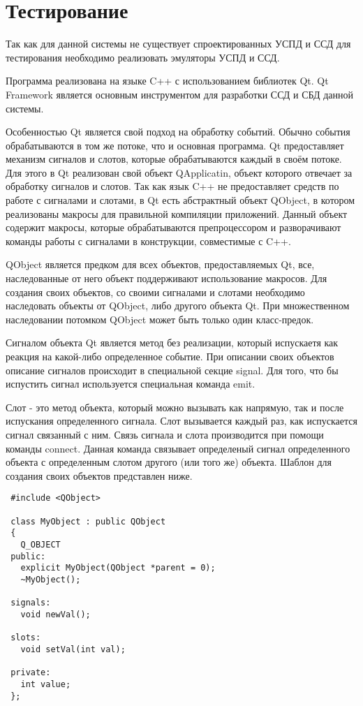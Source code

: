 \newpage
\section{Тестирование}
\setcounter{figure}{0}

Так как для данной системы не существует спроектированных УСПД и ССД для тестирования необходимо реализовать эмуляторы УСПД и ССД. 

Программа реализована на языке C++ с использованием библиотек Qt. Qt Framework является основным инструментом для разработки ССД и СБД данной системы.

Особенностью Qt является свой подход на обработку событий. Обычно события обрабатываются в том же потоке, что и основная программа. Qt предоставляет механизм сигналов и слотов, которые обрабатываются каждый в своём потоке. Для этого в Qt реализован свой объект QApplicatin, объект которого отвечает за обработку сигналов и слотов. Так как язык C++ не предоставляет средств по работе с сигналами и слотами, в Qt есть абстрактный объект QObject, в котором реализованы макросы для правильной компиляции приложений. Данный объект содержит макросы, которые обрабатываются препроцессором и разворачивают команды работы с сигналами в конструкции, совместимые с C++.

QObject является предком для всех объектов, предоставляемых Qt, все, наследованные от него объект поддерживают использование макросов. Для создания своих объектов, со своими сигналами и слотами необходимо наследовать объекты от QObject, либо другого объекта Qt. При множественном наследовании потомком QObject может быть только один класс-предок. 

Сигналом объекта Qt является метод без реализации, который испускаетя как реакция на какой-либо определенное событие. При описании своих объектов описание сигналов происходит в специальной секцие signal. Для того, что бы испустить сигнал используется специальная команда emit.

Слот - это метод объекта, который можно вызывать как напрямую, так и после испускания определенного сигнала. Слот вызывается каждый раз, как испускается сигнал связанный с ним. Связь сигнала и слота производится при помощи команды connect. Данная команда связывает определеный сигнал определенного объекта с определенным слотом другого (или того же) объекта. Шаблон для создания своих объектов представлен ниже.

\begin{lstlisting}
 #include <QObject>
 
 class MyObject : public QObject
 {
   Q_OBJECT
 public:
   explicit MyObject(QObject *parent = 0);
   ~MyObject();
   
 signals:
   void newVal();
   
 slots:
   void setVal(int val);
   
 private:
   int value;
 };
\end{lstlisting}

